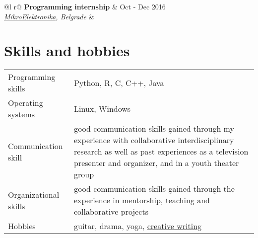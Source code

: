 \documentclass[a4paper,12pt]{article}
\begin{document}
\begin{tabularx}{\linewidth}{ @{}l r@{} }
\textbf{Programming internship} & \hfill Oct - Dec 2016 \\
\textit{\href{https://www.mikroe.com/}{MikroElektronika}, Belgrade } & \\[3.75pt]
\end{tabularx}


\section{Skills and hobbies}
\begin{tabularx}{\linewidth}{@{}l X@{}}
Programming skills &  \normalsize{Python, R, C, C++, Java}\\
Operating systems &  \normalsize{Linux, Windows}\\
Communication skill & \normalsize{good communication skills gained through my experience with collaborative interdisciplinary research as well as past experiences as a television presenter and organizer, and in a youth theater group} \\
Organizational skills  &  \normalsize{good communication skills gained through the experience in mentorship, teaching and collaborative projects}\\  
Hobbies &  \normalsize{guitar, drama, yoga, \href{http://blablablatruc.blogspot.com/}{creative writing}}\\
\end{tabularx}

\vfill
{}
\end{document}
